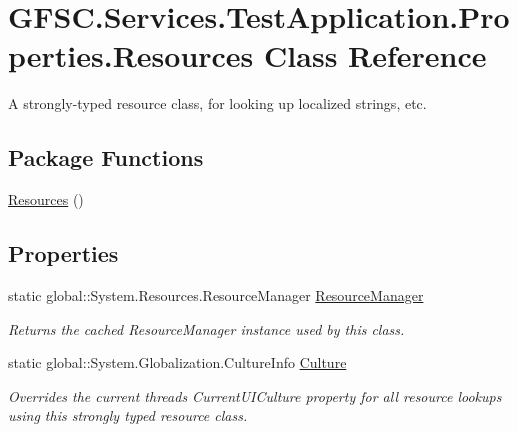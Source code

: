 \hypertarget{class_g_f_s_c_1_1_services_1_1_test_application_1_1_properties_1_1_resources}{}\section{G\+F\+S\+C.\+Services.\+Test\+Application.\+Properties.\+Resources Class Reference}
\label{class_g_f_s_c_1_1_services_1_1_test_application_1_1_properties_1_1_resources}


A strongly-\/typed resource class, for looking up localized strings, etc.  


\subsection*{Package Functions}
\begin{DoxyCompactItemize}
\item 
\mbox{\hyperlink{class_g_f_s_c_1_1_services_1_1_test_application_1_1_properties_1_1_resources_aced6ef11e2b6e77260c14cef830ce6d1}{Resources}} ()
\end{DoxyCompactItemize}
\subsection*{Properties}
\begin{DoxyCompactItemize}
\item 
static global\+::\+System.\+Resources.\+Resource\+Manager \mbox{\hyperlink{class_g_f_s_c_1_1_services_1_1_test_application_1_1_properties_1_1_resources_a7d76cabb088c3f432542b62a315008bd}{Resource\+Manager}}
\begin{DoxyCompactList}\small\item\em Returns the cached Resource\+Manager instance used by this class. \end{DoxyCompactList}\item 
static global\+::\+System.\+Globalization.\+Culture\+Info \mbox{\hyperlink{class_g_f_s_c_1_1_services_1_1_test_application_1_1_properties_1_1_resources_ad5e483bf5cb8cbadc5d10c2ec126121e}{Culture}}
\begin{DoxyCompactList}\small\item\em Overrides the current thread\textquotesingle{}s Current\+U\+I\+Culture property for all resource lookups using this strongly typed resource class. \end{DoxyCompactList}\end{DoxyCompactItemize}
